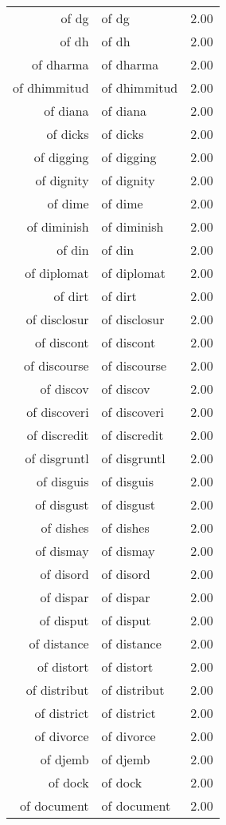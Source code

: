 \begin{table}[ht]
\begin{tabular}{rlr}
  of dg & of dg & 2.00 \\ 
  of dh & of dh & 2.00 \\ 
  of dharma & of dharma & 2.00 \\ 
  of dhimmitud & of dhimmitud & 2.00 \\ 
  of diana & of diana & 2.00 \\ 
  of dicks & of dicks & 2.00 \\ 
  of digging & of digging & 2.00 \\ 
  of dignity & of dignity & 2.00 \\ 
  of dime & of dime & 2.00 \\ 
  of diminish & of diminish & 2.00 \\ 
  of din & of din & 2.00 \\ 
  of diplomat & of diplomat & 2.00 \\ 
  of dirt & of dirt & 2.00 \\ 
  of disclosur & of disclosur & 2.00 \\ 
  of discont & of discont & 2.00 \\ 
  of discourse & of discourse & 2.00 \\ 
  of discov & of discov & 2.00 \\ 
  of discoveri & of discoveri & 2.00 \\ 
  of discredit & of discredit & 2.00 \\ 
  of disgruntl & of disgruntl & 2.00 \\ 
  of disguis & of disguis & 2.00 \\ 
  of disgust & of disgust & 2.00 \\ 
  of dishes & of dishes & 2.00 \\ 
  of dismay & of dismay & 2.00 \\ 
  of disord & of disord & 2.00 \\ 
  of dispar & of dispar & 2.00 \\ 
  of disput & of disput & 2.00 \\ 
  of distance & of distance & 2.00 \\ 
  of distort & of distort & 2.00 \\ 
  of distribut & of distribut & 2.00 \\ 
  of district & of district & 2.00 \\ 
  of divorce & of divorce & 2.00 \\ 
  of djemb & of djemb & 2.00 \\ 
  of dock & of dock & 2.00 \\ 
  of document & of document & 2.00 \\ 

\end{tabular}
\end{table}
